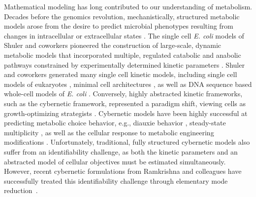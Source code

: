 \documentclass[12pt]{article}
\begin{document}
Mathematical modeling has long contributed to our understanding of metabolism. Decades before the genomics revolution, mechanistically, structured metabolic models arose from the desire to predict microbial phenotypes resulting from changes in intracellular or extracellular states \citep{1976_fredrickson_BiotechBioeng}.
The single cell \textit{E. coli} models of Shuler and coworkers pioneered the construction of large-scale, dynamic metabolic models that incorporated multiple, regulated catabolic and anabolic pathways constrained by experimentally determined kinetic parameters \citep{1984_domach_shuler_BiotechBioeng_01}.
Shuler and coworkers generated many single cell kinetic models, including single cell models of eukaryotes \citep{1989_steinmeyer_shuler_ChemEngSci,1992_wu_shuler_AnnNYAcadSci}, minimal cell architectures \citep{2004_castellanos_shuler_PNAS}, as well as DNA sequence based whole-cell models of \textit{E. coli} \citep{2008_atlas_shuler_IETSysBio}.
Conversely, highly abstracted kinetic frameworks, such as the cybernetic framework, represented a paradigm shift, viewing cells as growth-optimizing strategists \citep{1985_dhurjati_ramkrishna_tsao_BiotechBioeng}.
Cybernetic models have been highly successful at predicting metabolic choice behavior, e.g., diauxie behavior \citep{1986_kompala_ramkrishna_tsao_BiotechBioeng}, steady-state multiplicity \citep{2012_kim_ramkrishna_BiotechProg}, as well as the cellular response to metabolic engineering modifications \citep{1999_varner_ramkrishna_MetaEng}.
Unfortunately, traditional, fully structured cybernetic models also suffer from an identifiability challenge, as both the kinetic parameters and an abstracted model of cellular objectives must be estimated simultaneously.
However, recent cybernetic formulations from Ramkrishna and colleagues have successfully treated this identifiability challenge through elementary mode reduction~\cite{2009_song_ramkrishna_BiotechBioeng,Song:2011aa}.
\end{document}
